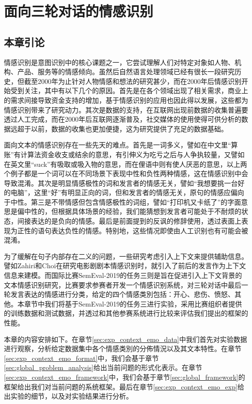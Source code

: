 \chapter{面向三轮对话的情感识别}
\label{cha:exp_context_emo}

\section{本章引论}

情感识别是意图识别中的核心课题之一，它尝试理解人们对特定对象如人物、机构、产品、服务等的情感倾向。虽然后自然语言处理领域已经有很长一段研究历史，但截至2000年为止针对人物情感和想法的研究甚少\cite{liu2012sentiment}，而在2000年后情感识别开始受到关注，其中有以下几个的原因。首先是在各个领域出现了相关需求，商业上的需求间接导致资金支持的增加，基于情感识别的应用也因此得以发展，这些都为情感识别带来了研究动力。其次是数据的支持，在互联网出现前数据的收集普遍要透过人工完成，而在2000年后互联网逐渐普及，社交媒体的使用使得可供分析的数据远超于以前，数据的收集也更加便捷，这为研究提供了充足的数据基础。

面向文本的情感识别存在一些先天的难点。首先是一词多义，譬如在中文里“算账”有计算法资金收支或结余的意思，有引伸义为吃亏之后与人争执较量，又譬如在英文里“suck”有吸取或吸入物的意思，而在俚语中则有使人厌恶的意思，以上两个例子都是一个词可以在不同场景下表现中性和负性两种情感，这在情感识别中会导致混淆。其次是明显情感极性的词和发言者的情感无关，譬如“我想要挑一台好的电脑”，这里“好”有明显正向的词，但和发言者的情感无关，原句的情感应偏向于中性。第三是不带情感但包含情感极性的词组，譬如“打印机又卡纸了”的字面意思是偏中性的，但根据具体场景的经验，我们能猜想到发言者可能处于不耐烦的状态，间接表达的是负向的情感。最后是前面提到的反讽的修辞使用，透过表面上表现为正性的语句表达负性的情感。特别地，这些情况即使由人工识别也有可能会被混淆。

为了缓解在句子内部存在二义的问题，一些研究考虑引入上下文来提供辅助信息。譬如Zahiri和Choi\cite{Zahiri2017Emotion}在研究电影剧剧本情感识别时，就引入了前后的发言作为上下文信息来建模。而国际比赛SemEval-2019的任务三\cite{SemEval2019Task3}则是旨在促进引入上下文背景的文本情感识别研究，比赛要求参赛者开发一个情感识别系统，对三轮对话中最后一轮发言表达的情感进行分类，给定的四个情感类別包括：开心、悲伤、愤怒、其他。本章节中我们将基于SemEval-2019的任务三进行实验，采用比赛组织者提供的训练数据和测试数据，并透过和其他参赛系统进行比较来评估我们提出的框架的性能。

本章的内容安排如下。在章节\ref{sec:exp_context_emo_data}中我们首先对实验数据进行观察，分析给定数据集中各个情感类別的分佈情況以及其文本特性。在章节\ref{sec:exp_context_emo_format}中，我们会基于章节\ref{sec:global_problem_analysis}给出当前问题的形式化表示。在章节\ref{sec:exp_context_emo_framework}中，我们会基于章节\ref{sec:global_framework}的框架给出我们对当前问题的系统框架。最后在章节\ref{sec:exp_context_emo_exp}给出实验的细节，以及对实验结果进行分析。


